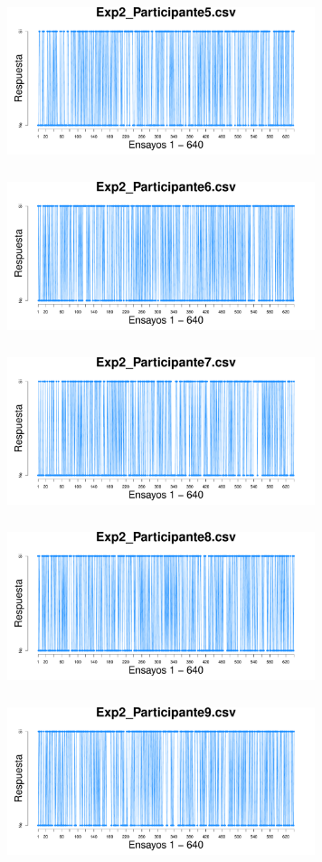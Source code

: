 \documentclass[a4paper ]{article}
\begin{document}
\begin{figure}[th]
\includegraphics[width=9cm, height=5cm]{Figures/Response_Exp2_P5} \includegraphics[width=9cm, height=5cm]{Figures/Response_Exp2_P6}
\includegraphics[width=9cm, height=5cm]{Figures/Response_Exp2_P7} \includegraphics[width=9cm, height=5cm]{Figures/Response_Exp2_P8} 
\includegraphics[width=9cm, height=5cm]{Figures/Response_Exp2_P9}
\end{figure}
\end{document}
